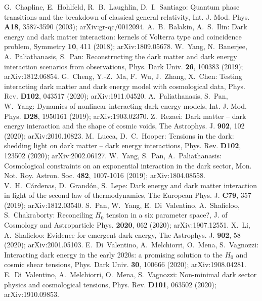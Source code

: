 \documentclass{article}
\begin{document}
\begin{thebibliography}{99}
G.~Chapline, E.~Hohlfeld, R.~B.~Laughlin, D.~I.~Santiago: Quantum phase transitions and the breakdown of classical general relativity, Int. J. Mod. Phys. \textbf{A18}, 3587-3590 (2003); arXiv:gr-qc/0012094.
A.~B.~Balakin, A.~S.~Ilin: Dark energy and dark matter interaction: kernels of Volterra type and coincidence problem, Symmetry \textbf{10}, 411 (2018); arXiv:1809.05678.
W.~Yang, N.~Banerjee, A.~Paliathanasis, S.~Pan: Reconstructing the dark matter and dark energy interaction scenarios from observations, Phys. Dark Univ. \textbf{26}, 100383 (2019); arXiv:1812.06854.
G.~Cheng, Y.-Z.~Ma, F.~Wu, J.~Zhang, X.~Chen: Testing interacting dark matter and dark energy model with cosmological data, Phys. Rev. \textbf{D102}, 043517 (2020); arXiv:1911.04520.
A.~Paliathanasis, S.~Pan, W.~Yang: Dynamics of nonlinear interacting dark energy models, Int. J. Mod. Phys. \textbf{D28}, 1950161 (2019); arXiv:1903.02370.
Z.~Rezaei: Dark matter -- dark energy interaction and the shape of cosmic voids, The Astrophys. J. \textbf{902}, 102 (2020); arXiv:2010.10823.
M.~Lucca, D.~C.~Hooper: Tensions in the dark: shedding light on dark matter -- dark energy interactions, Phys. Rev. \textbf{D102}, 123502 (2020); arXiv:2002.06127.
W.~Yang, S.~Pan, A.~Paliathanasis: Cosmological constraints on an exponential interaction in the dark sector, Mon. Not. Roy. Astron. Soc. \textbf{482}, 1007-1016 (2019); arXiv:1804.08558.
V.~H.~Cárdenas, D.~Grandón, S.~Lepe: Dark energy and dark matter interaction in light of the second law of thermodynamics, The European Phys. J. \textbf{C79}, 357 (2019); arXiv:1812.03540.
S.~Pan, W.~Yang, E.~Di~Valentino, A.~Shafieloo, S.~Chakraborty: Reconciling $H_0$ tension in a six parameter space?, J. of Cosmology and Astroparticle Phys. \textbf{2020}, 062 (2020); arXiv:1907.12551.
X.~Li, A.~Shafieloo: Evidence for emergent dark energy, The Astrophys. J. \textbf{902}, 58 (2020); arXiv:2001.05103.
E.~Di~Valentino, A.~Melchiorri, O.~Mena, S.~Vagnozzi: Interacting dark energy in the early 2020s: a promising solution to the $H_0$ and cosmic shear tensions, Phys. Dark Univ. \textbf{30}, 100666 (2020); arXiv:1908.04281.
E.~Di~Valentino, A.~Melchiorri, O.~Mena, S.~Vagnozzi: Non-minimal dark sector physics and cosmological tensions, Phys. Rev. \textbf{D101}, 063502 (2020); arXiv:1910.09853.

\end{thebibliography}
\end{document}
